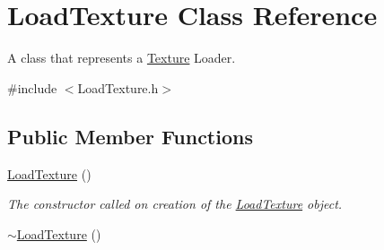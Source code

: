 \hypertarget{class_load_texture}{\section{Load\+Texture Class Reference}
\label{class_load_texture}
}


A class that represents a \hyperlink{class_texture}{Texture} Loader.  




{\ttfamily \#include $<$Load\+Texture.\+h$>$}

\subsection*{Public Member Functions}
\begin{DoxyCompactItemize}
\item 
\hypertarget{class_load_texture_ac19d60bf7cd2cd0824d7aa374c0b66de}{\hyperlink{class_load_texture_ac19d60bf7cd2cd0824d7aa374c0b66de}{Load\+Texture} ()}\label{class_load_texture_ac19d60bf7cd2cd0824d7aa374c0b66de}

\begin{DoxyCompactList}\small\item\em The constructor called on creation of the \hyperlink{class_load_texture}{Load\+Texture} object. \end{DoxyCompactList}\item 
\hypertarget{class_load_texture_a182de305868f31a00349a5700be12ba5}{\hyperlink{class_load_texture_a182de305868f31a00349a5700be12ba5}{$\sim$\+Load\+Texture} ()}\label{class_load_texture_a182de305868f31a00349a5700be12ba5}


\end{DoxyCompactItemize}
